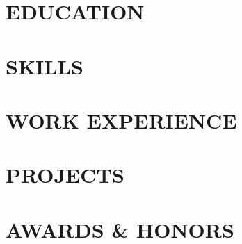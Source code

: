 \documentclass[11pt,letterpaper]{article}
\newcommand{\xspace}{0.25\baselineskip}
\begin{document}


\section*{EDUCATION}
    

\section*{SKILLS}

\section*{WORK EXPERIENCE}
    

\section*{PROJECTS}
    
    \vspace{\xspace}
    
    \vspace{\xspace} %
    
    \vspace{\xspace} %
    

\section{AWARDS \& HONORS}
    

\end{document}
